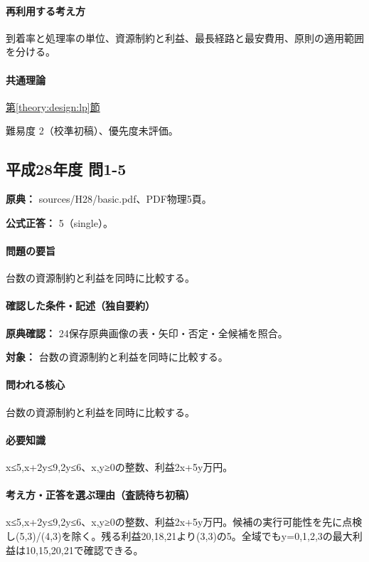 \paragraph{再利用する考え方} 到着率と処理率の単位、資源制約と利益、最長経路と最安費用、原則の適用範囲を分ける。

\paragraph{共通理論} \hyperref[theory:design:lp]{第\ref*{theory:design:lp}節}

\par 難易度 2（校準初稿）、優先度未評価。

\subsection{平成28年度 問1-5}
\label{q:h28-reg-basic-1-5}

\noindent\textbf{原典：} sources/H28/basic.pdf、PDF物理5頁。

\textbf{公式正答：} 5（single）。

\paragraph{問題の要旨} 台数の資源制約と利益を同時に比較する。

\paragraph{確認した条件・記述（独自要約）}\mbox{}\par

\noindent\textbf{原典確認：} 24保存原典画像の表・矢印・否定・全候補を照合。\par

\noindent\textbf{対象：} 台数の資源制約と利益を同時に比較する。\par

\paragraph{問われる核心} 台数の資源制約と利益を同時に比較する。

\paragraph{必要知識} x≤5,x+2y≤9,2y≤6、x,y≥0の整数、利益2x+5y万円。

\paragraph{考え方・正答を選ぶ理由（査読待ち初稿）} x≤5,x+2y≤9,2y≤6、x,y≥0の整数、利益2x+5y万円。候補の実行可能性を先に点検し(5,3)/(4,3)を除く。残る利益20,18,21より(3,3)の5。全域でもy=\allowbreak{}0,1,2,3の最大利益は10,15,20,21で確認できる。

